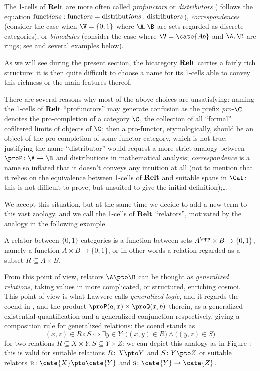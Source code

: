 \begin{remark}
The 1-cells of $\textbf{Relt}$ are more often called \emph{profunctors} or \emph{distributors} (\cite{benabou2000distributors} follows the equation $\text{funct\emph{ions}} : \text{funct\emph{ors}} = \text{distribut\emph{ions}} : \text{distribut\emph{ors}}$), \emph{correspondences} (consider the case when $\V=\{0,1\}$ \ie where $\A, \B$ are sets regarded as discrete categories), or \emph{bimodules} (consider the case where $\V=\cate{Ab}$ and $\A,\B$ are rings; see \cite{nashphd} and several examples below).

As we will see during the present section, the bicategory $\textbf{Relt}$ carries a fairly rich structure: it is then quite difficult to choose a name for its 1-cells able to convey this richness or the main features thereof. 

There are several reasons why most of the above choices are unsatisfying: naming the 1-cells of $\textbf{Relt}$ ``profunctors'' may generate confusion as the prefix \emph{pro-$\C$} denotes the pro-completion of a category $\C$, \ie the collection of all ``formal'' cofiltered limits of objects of $\C$; then a pro-functor, etymologically, should be an object of the pro-completion of some functor category, which is not true; justifying the name ``distributor'' would request a more strict analogy between $\proP \colon \A \to \B$ and distributions in mathematical analysis; \emph{correspondence} is a name so inflated that it doesn't conveys any intuition at all (not to mention that it relies on the equivalence between 1-cells of $\textbf{Relt}$ and suitable spans in $\Cat$: this is not difficult to prove, but unsuited to give the initial definition);\dots

We accept this situation, but at the same time we decide to add a new term to this vast zoology, and we call the 1-cells of $\textbf{Relt}$ ``relators'', motivated by the analogy in the following example.
\end{remark}
\begin{example}
A relator between $\{0,1\}$-categories is a function between sets $A^\opp\times B\to \{0,1\}$, namely a function $A\times B \to \{0,1\}$, or in other words a relation regarded as a subset $R\subseteq A\times B$.

From this point of view, relators $\A\pto \B$ can be thought as \emph{generalized relations}, taking values in more complicated, or structured, enriching cosmoi. This point of view is what Lawvere \cite[\S\textbf{4},\textbf{5}]{LawvereFW:metsgl} calls \emph{generalized logic}, and it regards the coend in \adef {}, and the product $\proP(a,x)\times \proQ(x,b)$ therein, as a generalized existential quantification and a generalized conjunction respectively, giving a composition rule for generalized relations: the coend stands as
\[
(x,z)\in R\circ S \iff \exists y\in Y : \big((x,y)\in R\big)\land \big((y,z)\in S\big)
\]
for two relations $R\subseteq X\times Y, S\subseteq Y\times Z$: we can depict this analogy as in Figure : this is valid for suitable relations $R\colon X\pto Y$ and $S\colon Y\pto Z$ or suitable relators $\textsc{r}\colon \cate{X}\pto \cate{Y}$ and $\textsc{s}\colon \cate{Y}\to\cate{Z}$.
\end{example}

